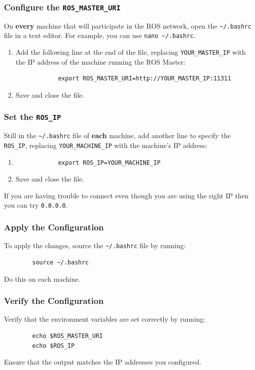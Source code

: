 \documentclass[12pt,a4paper]{article}
\begin{document}
	\subsubsection{Configure the \texttt{ROS\_MASTER\_URI}}
	On \textbf{every} machine that will participate in the ROS network, open the \texttt{\textasciitilde/.bashrc} file in a text editor. For example, you can use \texttt{nano \textasciitilde/.bashrc}.
	\begin{enumerate}
		\item Add the following line at the end of the file, replacing \texttt{YOUR\_MASTER\_IP} with the IP address of the machine running the ROS Master:
		\begin{verbatim}
			export ROS_MASTER_URI=http://YOUR_MASTER_IP:11311
		\end{verbatim}
		\item Save and close the file.
	\end{enumerate}
	
	\subsubsection{Set the \texttt{ROS\_IP}}
	Still in the \texttt{\textasciitilde/.bashrc} file of \textbf{each} machine, add another line to specify the \texttt{ROS\_IP}, replacing \texttt{YOUR\_MACHINE\_IP} with the machine's IP address:
	\begin{enumerate}
		\item 
		\begin{verbatim}
			export ROS_IP=YOUR_MACHINE_IP
		\end{verbatim}
		\item Save and close the file.
	\end{enumerate}
	If you are having trouble to connect even though you are using the right IP then you can try \texttt{0.0.0.0}.
	
	\subsubsection{Apply the Configuration}
	To apply the changes, source the \texttt{\textasciitilde/.bashrc} file by running:
	\begin{verbatim}
		source ~/.bashrc
	\end{verbatim}
	Do this on each machine.
	
	\subsubsection{Verify the Configuration}
	Verify that the environment variables are set correctly by running:
	\begin{verbatim}
		echo $ROS_MASTER_URI
		echo $ROS_IP
	\end{verbatim}
	Ensure that the output matches the IP addresses you configured.
	
\end{document}
